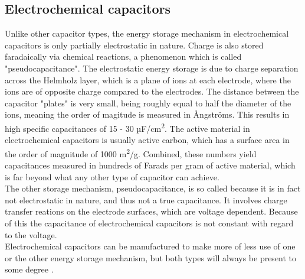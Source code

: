 \documentclass[12pt]{article} %
\begin{document}
\subsection{Electrochemical capacitors}

Unlike other capacitor types, the energy storage mechanism in electrochemical capacitors is only partially electrostatic in nature.
Charge is also stored faradaically via chemical reactions, a phenomenon which is called "pseudocapacitance".
The electrostatic energy storage is due to charge separation across the Helmholz layer, which is a plane of ions at each electrode, where the ions are of opposite charge compared to the electrodes.
The distance between the capacitor "plates" is very small, being roughly equal to half the diameter of the ions, meaning the order of magitude is measured in Ångströms.
This results in high specific capacitances of 15 - 30 µF/cm\textsuperscript{2}.
The active material in electrochemical capacitors is usually active carbon, which has a surface area in the order of magnitude of 1000 m\textsuperscript{2}/g.
Combined, these numbers yield capacitances measured in hundreds of Farads per gram of active material, which is far beyond what any other type of capacitor can achieve.
\\
The other storage mechanism, pseudocapacitance, is so called because it is in fact not electrostatic in nature, and thus not a true capacitance.
It involves charge transfer reations on the electrode surfaces, which are voltage dependent.
Because of this the capacitance of electrochemical capacitors is not constant with regard to the voltage.
\\
Electrochemical capacitors can be manufactured to make more of less use of one or the other energy storage mechanism, but both types will always be present to some degree \cite{reddy_thomas_section_2011-5}.



\end{document}
